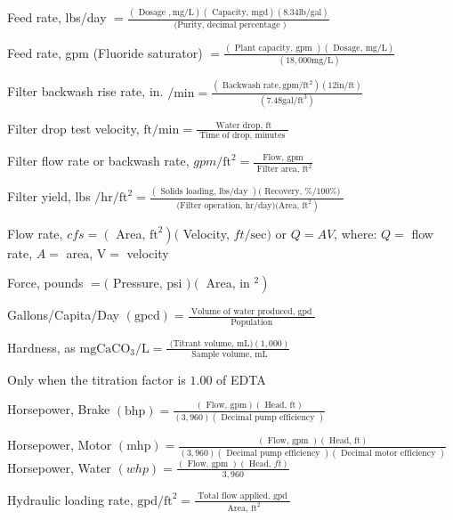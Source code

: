 \documentclass[10pt]{article}
\begin{document}
Feed rate, lbs/day $=\frac{(\text { Dosage }, \mathrm{mg} / \mathrm{L})(\text { Capacity, } \mathrm{mgd})(8.34 \mathrm{lb} / \mathrm{gal})}{\text { (Purity, decimal percentage })}$

Feed rate, gpm (Fluoride saturator) $=\frac{(\text { Plant capacity, gpm })(\text { Dosage, } \mathrm{mg} / \mathrm{L})}{(18,000 \mathrm{mg} / \mathrm{L})}$

Filter backwash rise rate, in. $/ \mathrm{min}=\frac{\left(\text { Backwash } \mathrm{rate}, \mathrm{gpm} / \mathrm{ft}^{2}\right)(12 \mathrm{in} / \mathrm{ft})}{\left(7.48 \mathrm{gal} / \mathrm{ft}^{3}\right)}$

Filter drop test velocity, $\mathrm{ft} / \mathrm{min}=\frac{\text { Water drop, } \mathrm{ft}}{\text { Time of drop, minutes }}$

Filter flow rate or backwash rate, $g p m / \mathrm{ft}^{2}=\frac{\text { Flow, gpm }}{\text { Filter area, } \mathrm{ft}^{2}}$

Filter yield, lbs $/ \mathrm{hr} / \mathrm{ft}^{2}=\frac{(\text { Solids loading, lbs/day })(\text { Recovery, \%/100\%) }}{\left.\text { (Filter operation, hr/day)(Area, } \mathrm{ft}^{2}\right)}$

Flow rate, $c f s=\left(\right.$ Area, $\left.\mathrm{ft}^{2}\right)($ Velocity, $f t / \mathrm{sec})$ or $Q=A V$, where: $Q=$ flow rate, $A=$ area, $\mathrm{V}=$ velocity

Force, pounds $=($ Pressure, psi $)\left(\right.$ Area, in $\left.{ }^{2}\right)$

Gallons/Capita/Day $(\mathrm{gpcd})=\frac{\text { Volume of water produced, gpd }}{\text { Population }}$

Hardness, as $\mathrm{mg} \mathrm{CaCO}_{3} / \mathrm{L}=\frac{\text { (Titrant volume, } \mathrm{mL})(1,000)}{\text { Sample volume, } \mathrm{mL}}$

Only when the titration factor is $1.00$ of EDTA

Horsepower, Brake $(\mathrm{bhp})=\frac{(\text { Flow, } \mathrm{gpm})(\text { Head, } \mathrm{ft})}{(3,960)(\text { Decimal pump efficiency })}$

Horsepower, Motor $(\mathrm{mhp})=\frac{(\text { Flow, gpm })(\text { Head, } \mathrm{ft})}{(3,960)(\text { Decimal pump efficiency })(\text { Decimal motor efficiency })}$ Horsepower, Water $(w h p)=\frac{(\text { Flow, gpm })(\text { Head, } f t)}{3,960}$

Hydraulic loading rate, $\mathrm{gpd} / \mathrm{ft}^{2}=\frac{\text { Total flow applied, gpd }}{\text { Area, } \mathrm{ft}^{2}}$
\end{document}
